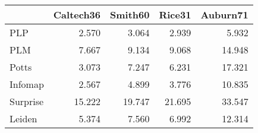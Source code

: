 \begin{tabular}{lrrrr}
\toprule
{} & Caltech36 & Smith60 & Rice31 & Auburn71 \\
\midrule
PLP      &     2.570 &   3.064 &  2.939 &    5.932 \\
PLM      &     7.667 &   9.134 &  9.068 &   14.948 \\
Potts    &     3.073 &   7.247 &  6.231 &   17.321 \\
Infomap  &     2.567 &   4.899 &  3.776 &   10.835 \\
Surprise &    15.222 &  19.747 & 21.695 &   33.547 \\
Leiden   &     5.374 &   7.560 &  6.992 &   12.314 \\
\bottomrule
\end{tabular}
